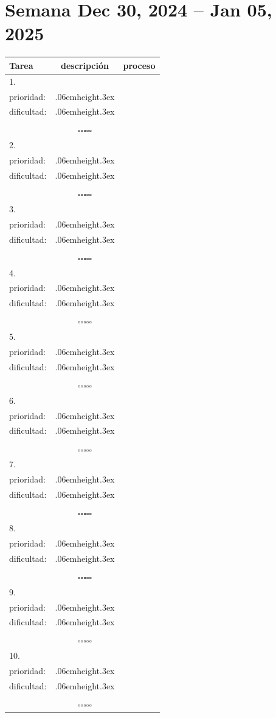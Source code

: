 \documentclass[a4paper,12pt, tikz]{scrartcl}
\newcommand\Vtextvisiblespace[1][.3em]{%
  \mbox{\kern.06em\vrule height.3ex}%
  \vbox{\hrule width#1}%
  \hbox{\vrule height.3ex}}
\newcommand{\subtablaDescrip}{ \begin{tabular}{ll}&\\ prioridad: & \Vtextvisiblespace[2em] \\ dificultad: & \Vtextvisiblespace[2em]\\&\\ \end{tabular}}
\begin{document}
\section*{Semana Dec 30, 2024 -- Jan 05, 2025}
\thispagestyle{empty}
\noindent
\begin{tabularx}{\linewidth}{|X|c c|}
    \hline
  \textbf{Tarea} & \textbf{descripción} & \textbf{proceso}\\
  \hline
   1.\vspace{4ex} &      \subtablaDescrip     & $\square\square\square\square\square$ \\
  \hline
  2.\vspace{4ex} &      \subtablaDescrip     & $\square\square\square\square\square$ \\
  \hline
  3.\vspace{4ex} &      \subtablaDescrip     & $\square\square\square\square\square$ \\
  \hline
  4.\vspace{4ex} &      \subtablaDescrip     & $\square\square\square\square\square$ \\
  \hline
  5.\vspace{4ex} &      \subtablaDescrip     & $\square\square\square\square\square$ \\
  \hline
  6.\vspace{4ex} &      \subtablaDescrip     & $\square\square\square\square\square$ \\
  \hline
  7.\vspace{4ex} &      \subtablaDescrip     & $\square\square\square\square\square$ \\
  \hline
  8.\vspace{4ex} &      \subtablaDescrip     & $\square\square\square\square\square$ \\
  \hline
  9.\vspace{4ex} &      \subtablaDescrip     & $\square\square\square\square\square$ \\
  \hline
  10.\vspace{4ex} &      \subtablaDescrip     & $\square\square\square\square\square$ \\
  \hline
\end{tabularx}

\newpage
\end{document}
